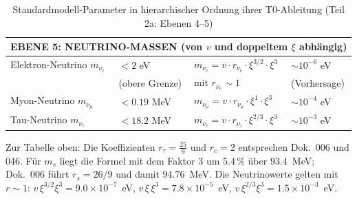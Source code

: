 \begin{table}[htbp]
{\begin{tabular}{p{4cm}p{2.5cm}p{3.5cm}p{2.7cm}}
			\midrule
			\multicolumn{4}{l}{\textbf{EBENE 5: NEUTRINO-MASSEN (von $v$ und doppeltem $\xi$ abhängig)}} \\
			\midrule
			Elektron-Neutrino $m_{\nu_e}$ & $< 2$ eV & $m_{\nu_e} = v \cdot r_{\nu_e} \cdot \xi^{3/2} \cdot \xi^3$ & $\sim 10^{-6}$ eV \\
			& (obere Grenze) & mit $r_{\nu_e} \sim 1$ & (Vorhersage) \\[0.3em]
			Myon-Neutrino $m_{\nu_\mu}$ & $< 0.19$ MeV & $m_{\nu_\mu} = v \cdot r_{\nu_\mu} \cdot \xi^{1} \cdot \xi^3$ & $\sim 10^{-4}$ eV \\
			Tau-Neutrino $m_{\nu_\tau}$ & $< 18.2$ MeV & $m_{\nu_\tau} = v \cdot r_{\nu_\tau} \cdot \xi^{2/3} \cdot \xi^3$ & $\sim 10^{-3}$ eV \\
			\bottomrule
		\end{tabular}%
}
	\caption{Standardmodell-Parameter in hierarchischer Ordnung ihrer T0-Ableitung (Teil 2a: Ebenen 4--5)}
	\label{tab:sm-params-2a}
\end{table}
Zur Tabelle oben: Die Koeffizienten $r_\tau = \frac{25}{9}$ und $r_c = 2$ entsprechen Dok.~006 und 046. Für $m_s$ liegt die Formel mit dem Faktor $3$ um $5.4\,\%$ über $93.4$~MeV; Dok.~006 führt $r_s = 26/9$ und damit $94.76$~MeV. Die Neutrinowerte gelten mit $r \sim 1$: $v\,\xi^{3/2}\xi^3 = 9.0\times10^{-7}$~eV, $v\,\xi\,\xi^3 = 7.8\times10^{-5}$~eV, $v\,\xi^{2/3}\xi^3 = 1.5\times10^{-3}$~eV.

